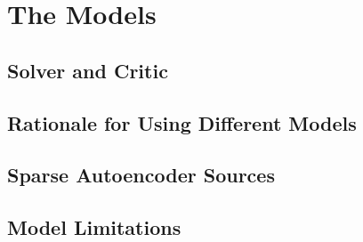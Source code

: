 \chapter{The Models}

\section{Solver and Critic}

\section{Rationale for Using Different Models}

\section{Sparse Autoencoder Sources}

\section{Model Limitations}
